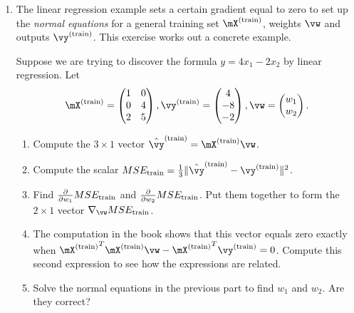 \documentclass{article}
\newcommand{\utrain}{^{\textnormal{(train)}}}
\newcommand{\strain}{_{\textnormal{train}}}
\begin{document}
\begin{enumerate}

\item \label{ML_ex_regression} 
The linear regression example sets a certain gradient equal to zero to set up the \emph{normal equations} for a general training set $\mX\utrain$, weights $\vw$ and outputs $\vy\utrain$. This exercise works out a concrete example.

Suppose we are trying to discover the formula $y = 4x_1 - 2x_2$ by linear regression. Let
\begin{equation*}
  \mX\utrain =  \begin{pmatrix}
                1 & 0 \\
                0 & 4 \\
                2 & 5
                \end{pmatrix}, 
  \vy\utrain =  \begin{pmatrix}
                4 \\
                -8 \\
                -2
                \end{pmatrix},
  \vw           = \begin{pmatrix}
                w_1 \\
                w_2
                \end{pmatrix}.
\end{equation*}                
\begin{enumerate}
    \item Compute the $3\times1$ vector $\hat{\vy}\utrain = \mX\utrain\vw$. 
    \item Compute the scalar $MSE\strain = \frac13 \lVert \hat{\vy}\utrain - \vy\utrain \rVert^2$.
    \item Find $\frac{\partial}{\partial w_1} MSE\strain$ and $\frac{\partial}{\partial w_2} MSE\strain$. Put them together to form the $2\times1$ vector $\nabla_\vw MSE\strain$.
    \item The computation in the book shows that this vector equals zero exactly when ${\mX\utrain}^T\mX\utrain\vw - {\mX\utrain}^T\vy\utrain = 0$. Compute this second expression to see how the expressions are related.
    \item Solve the normal equations in the previous part to find $w_1$ and $w_2$. Are they correct?
\end{enumerate}


\end{enumerate}
\end{document}
